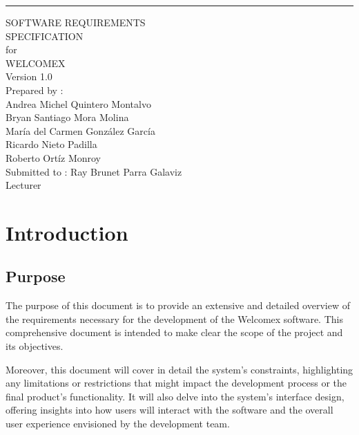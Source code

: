 \documentclass{scrreprt}
\date{}
\def\myversion{1.0 }
\begin{document}
\begin{flushright}
    \rule{16cm}{5pt}\vskip1cm
    \begin{bfseries}
        \Huge{SOFTWARE REQUIREMENTS\\ SPECIFICATION}\\
        \vspace{1.5cm}
        for\\
        \vspace{1.5cm}
        WELCOMEX\\
        \vspace{1.5cm}
        \LARGE{Version \myversion}\\
        \vspace{1.5cm}
        Prepared by :  \\
        Andrea Michel Quintero Montalvo\\
        Bryan Santiago Mora Molina\\
        María del Carmen González García\\
        Ricardo Nieto Padilla\\
        Roberto Ortíz Monroy\\
        \vspace{1.5cm}
        Submitted to : Ray Brunet Parra Galaviz \\Lecturer\\
        \vspace{1.5cm}
    \end{bfseries}
\end{flushright}

\tableofcontents

\listoffigures

\chapter{Introduction}

\section{Purpose}
The purpose of this document is to provide an extensive and detailed overview of the requirements necessary for the development of the Welcomex software. This comprehensive document is intended to make clear the scope of the project and its objectives.

Moreover, this document will cover in detail the system's constraints, highlighting any limitations or restrictions that might impact the development process or the final product's functionality. It will also delve into the system's interface design, offering insights into how users will interact with the software and the overall user experience envisioned by the development team.
\end{document}
